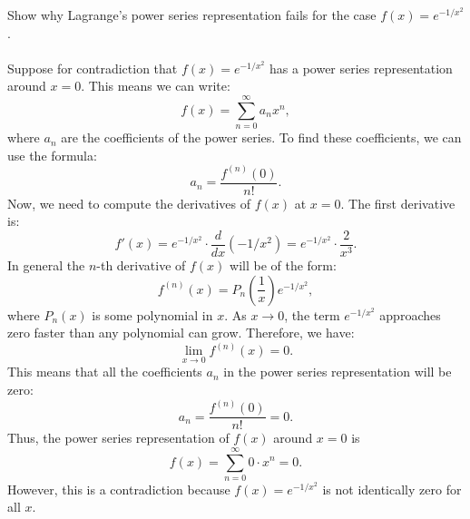 \documentclass[12pt]{exam}
\begin{document}
\begin{questions}
\newpage 
\question 
Show why Lagrange's power series representation fails for
the case $f(x) =e^{-1/x^2}$.
\\\\
Suppose for contradiction that $f(x) = e^{-1/x^2}$ has a power series representation around $x = 0$. This means we can write:
\[
  f(x) = \sum_{n=0}^{\infty} a_n x^n,
\]
where $a_n$ are the coefficients of the power series. To find these coefficients, we can use the formula:
\[
  a_n = \frac{f^{(n)}(0)}{n!}.
\]
Now, we need to compute the derivatives of $f(x)$ at $x = 0$.
The first derivative is:
\[
  f'(x) = e^{-1/x^2} \cdot \frac{d}{dx}(-1/x^2) = e^{-1/x^2} \cdot \frac{2}{x^3}.
\]
In general the $n$-th derivative of $f(x)$ will be of the form:
\[
  f^{(n)}(x) = P_n\left(\frac{1}{x}\right) e^{-1/x^2},
\]
where $P_n(x)$ is some polynomial in $x$. As $x \to 0$, the term $e^{-1/x^2}$ approaches zero faster than any polynomial can grow. Therefore, we have:
\[
  \lim_{x \to 0} f^{(n)}(x) = 0.
\]
This means that all the coefficients $a_n$ in the power series representation will be zero:
\[
  a_n = \frac{f^{(n)}(0)}{n!} = 0.
\]
Thus, the power series representation of $f(x)$ around $x = 0$ is
\[
  f(x) = \sum_{n=0}^{\infty} 0 \cdot x^n = 0.
\]
However, this is a contradiction because $f(x) = e^{-1/x^2}$ is not identically zero for all $x$.
\end{questions}
\end{document}
